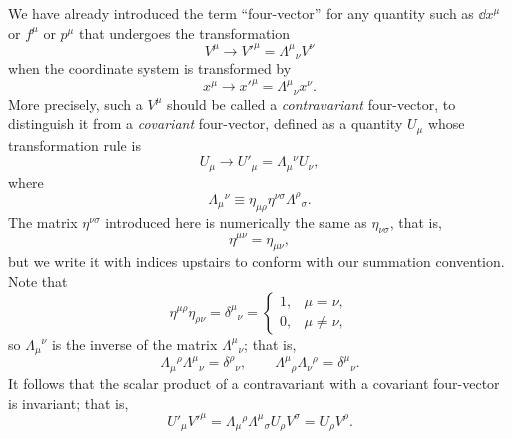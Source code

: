 We have already introduced the term ``four-vector'' for any quantity such as
\(\dd x^\mu\) or \(f^\mu\) or \(p^\mu\) that undergoes the transformation
\begin{equation}
  V^\mu\longrightarrow V'^\mu=\Lambda^\mu{}_\nu V^\nu
  \tag{2.5.1}\label{eq:2.5.1}
\end{equation}
when the coordinate system is transformed by
\begin{equation}
  x^\mu\longrightarrow x'^\mu=\Lambda^\mu{}_\nu x^\nu .
  \tag{2.5.2}\label{eq:2.5.2}
\end{equation}
More precisely, such a \(V^\mu\) should be called a \emph{contravariant}
four-vector, to distinguish it from a \emph{covariant} four-vector, defined as
a quantity \(U_\mu\) whose transformation rule is
\begin{equation}
  U_\mu\longrightarrow U'_\mu=\Lambda_\mu{}^\nu U_\nu ,
  \tag{2.5.3}\label{eq:2.5.3}
\end{equation}
where
\begin{equation}
  \Lambda_\mu{}^\nu
  \equiv\eta_{\mu\rho}\eta^{\nu\sigma}\Lambda^\rho{}_\sigma .
  \tag{2.5.4}\label{eq:2.5.4}
\end{equation}
The matrix \(\eta^{\nu\sigma}\) introduced here is numerically the same as
\(\eta_{\nu\sigma}\), that is,
\begin{equation}
  \eta^{\mu\nu}=\eta_{\mu\nu},
  \tag{2.5.5}\label{eq:2.5.5}
\end{equation}
but we write it with indices upstairs to conform with our summation convention.
Note that
\begin{equation}
  \eta^{\mu\rho}\eta_{\rho\nu}
  =\delta^\mu{}_\nu
  =\begin{cases}
      1,&\mu=\nu,\\
      0,&\mu\ne\nu,
    \end{cases}
  \tag{2.5.6}\label{eq:2.5.6}
\end{equation}
so \(\Lambda_\mu{}^\nu\) is the inverse of the matrix
\(\Lambda^\mu{}_\nu\); that is,
\begin{equation}
  \Lambda_\mu{}^\rho\Lambda^\mu{}_\nu=\delta^\rho{}_\nu,
  \qquad
  \Lambda^\mu{}_\rho\Lambda_\nu{}^\rho=\delta^\mu{}_\nu .
  \tag{2.5.7}\label{eq:2.5.7}
\end{equation}
It follows that the scalar product of a contravariant with a covariant
four-vector is invariant; that is,
\begin{equation}
  U'_\mu V'^\mu
  =\Lambda_\mu{}^\rho\Lambda^\mu{}_\sigma U_\rho V^\sigma
  =U_\rho V^\rho .
  \tag{2.5.8}\label{eq:2.5.8}
\end{equation}
